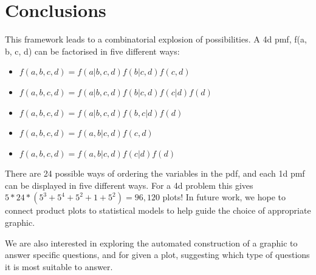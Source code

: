 \documentclass[journal]{vgtc}
\begin{document}
% 
% 
% 
% 



\section{Conclusions}

This framework leads to a combinatorial explosion of possibilities. A 4d pmf, f(a, b, c, d) can be factorised in five different ways:

\begin{itemize}
  \item $f(a, b, c, d) = f(a | b, c, d) f(b | c, d) f(c, d)$
  \item $f(a, b, c, d) = f(a | b, c, d) f(b | c, d) f(c | d) f(d)$
  \item $f(a, b, c, d) = f(a | b, c, d) f(b, c | d) f(d)$
  \item $f(a, b, c, d) = f(a, b | c, d) f(c, d)$
  \item $f(a, b, c, d) = f(a, b | c, d) f(c | d) f(d)$
\end{itemize}

\noindent There are 24 possible ways of ordering the variables in the pdf, and each 1d pmf can be displayed in five different ways. For a 4d problem this gives $5 * 24 * (5^3 + 5^4 + 5^2 + 1 + 5^2) = 96,120$ plots! In future work, we hope to connect product plots to statistical models to help guide the choice of appropriate graphic.

We are also interested in exploring the automated construction of a graphic to answer specific questions, and for given a plot, suggesting which type of questions it is most suitable to answer.




\end{document}
